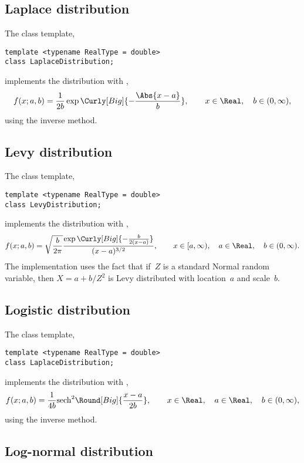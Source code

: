 \subsection{Laplace distribution}
\label{sub:Laplace distribution}

The class template,
\begin{verbatim}
template <typename RealType = double>
class LaplaceDistribution;
\end{verbatim}
implements the distribution with \pdf,
\begin{equation*}
  f(x;a,b) = \frac{1}{2b}\exp\Curly[Big]{-\frac{\Abs{x - a}}{b}},\qquad
  x \in \Real,\quad b \in (0, \infty),
\end{equation*}
using the inverse method.

\subsection{Levy distribution}
\label{sub:Levy distribution}

The class template,
\begin{verbatim}
template <typename RealType = double>
class LevyDistribution;
\end{verbatim}
implements the distribution with \pdf,
\begin{equation*}
  f(x;a,b) =
  \sqrt{\frac{b}{2\pi}}
  \frac{\exp\Curly[Big]{-\frac{b}{2(x - a)}}}{(x - a)^{3/2}},\qquad
  x \in [a, \infty),\quad a \in \Real,\quad b \in (0, \infty).
\end{equation*}
The implementation uses the fact that if~$Z$ is a standard Normal random
variable, then $X = a + b / Z^2$ is Levy distributed with location~$a$ and
scale~$b$.

\subsection{Logistic distribution}
\label{sub:Logistic distribution}

The class template,
\begin{verbatim}
template <typename RealType = double>
class LaplaceDistribution;
\end{verbatim}
implements the distribution with \pdf,
\begin{equation*}
  f(x;a,b) = \frac{1}{4b}\mathrm{sech}^2\Round[Big]{\frac{x - a}{2b}},\qquad
  x \in \Real,\quad a \in \Real,\quad b \in (0, \infty),
\end{equation*}
using the inverse method.

\subsection{Log-normal distribution}
\label{sub:Log-normal distribution}

